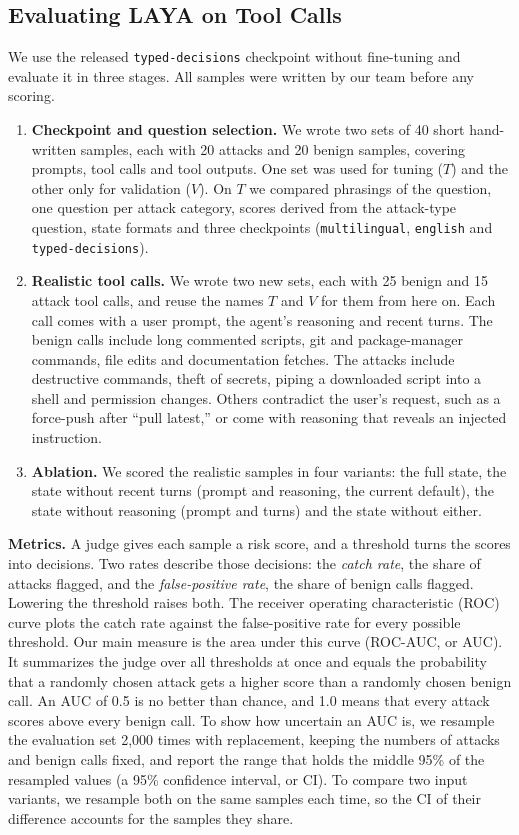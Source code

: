 \documentclass[sigconf,nonacm]{acmart}
\begin{document}
\subsection{Evaluating LAYA on Tool Calls}\label{sec:eval}
We use the released \texttt{typed-decisions} checkpoint without fine-tuning and evaluate it in three stages. All samples were written by our team before any scoring.
\begin{enumerate}
\item \textbf{Checkpoint and question selection.} We wrote two sets of 40 short hand-written samples, each with 20 attacks and 20 benign samples, covering prompts, tool calls and tool outputs. One set was used for tuning ($T$) and the other only for validation ($V$). On $T$ we compared phrasings of the question, one question per attack category, scores derived from the attack-type question, state formats and three checkpoints (\texttt{multilingual}, \texttt{english} and \texttt{typed-decisions}).
\item \textbf{Realistic tool calls.} We wrote two new sets, each with 25 benign and 15 attack tool calls, and reuse the names $T$ and $V$ for them from here on. Each call comes with a user prompt, the agent's reasoning and recent turns. The benign calls include long commented scripts, git and package-manager commands, file edits and documentation fetches. The attacks include destructive commands, theft of secrets, piping a downloaded script into a shell and permission changes. Others contradict the user's request, such as a force-push after ``pull latest,'' or come with reasoning that reveals an injected instruction.
\item \textbf{Ablation.} We scored the realistic samples in four variants: the full state, the state without recent turns (prompt and reasoning, the current default), the state without reasoning (prompt and turns) and the state without either.
\end{enumerate}
\textbf{Metrics.} A judge gives each sample a risk score, and a threshold turns the scores into decisions. Two rates describe those decisions: the \emph{catch rate}, the share of attacks flagged, and the \emph{false-positive rate}, the share of benign calls flagged. Lowering the threshold raises both. The receiver operating characteristic (ROC) curve plots the catch rate against the false-positive rate for every possible threshold. Our main measure is the area under this curve (ROC-AUC, or AUC). It summarizes the judge over all thresholds at once and equals the probability that a randomly chosen attack gets a higher score than a randomly chosen benign call. An AUC of 0.5 is no better than chance, and 1.0 means that every attack scores above every benign call. To show how uncertain an AUC is, we resample the evaluation set 2,000 times with replacement, keeping the numbers of attacks and benign calls fixed, and report the range that holds the middle 95\% of the resampled values (a 95\% confidence interval, or CI). To compare two input variants, we resample both on the same samples each time, so the CI of their difference accounts for the samples they share.
\end{document}
